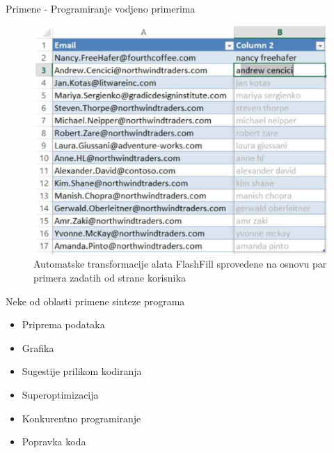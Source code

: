 \begin{frame}{Primene - Programiranje vodjeno primerima}
    \begin{figure}
        \begin{center}
            \includegraphics[scale=0.5]{../resources/PBE.PNG}
        \end{center}
        \caption{Automatske transformacije alata FlashFill sprovedene na osnovu par primera zadatih od strane korisnika}
    \end{figure}
\end{frame}

\begin{frame}{Neke od oblasti primene sinteze programa}
    \begin{itemize}
        \item Priprema podataka
        \item Grafika
        \item Sugestije prilikom kodiranja
        \item Superoptimizacija
        \item Konkurentno programiranje
        \item Popravka koda
    \end{itemize}
\end{frame}

